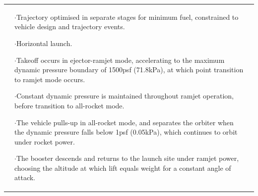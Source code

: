 {\begin{landscape}
\begin{xltabular}{\linewidth}{|X|X|X|}
	&\small
	
	$\cdot$Trajectory optimised in separate stages for minimum fuel, constrained to vehicle design and trajectory events. 
	
	$\cdot$Horizontal launch.
	
	$\cdot$Takeoff occurs in ejector-ramjet mode, accelerating to the maximum dynamic pressure boundary of 1500psf (71.8kPa), at which point transition to ramjet mode occurs. 
	
	$\cdot$Constant dynamic pressure is maintained throughout ramjet operation, before transition to all-rocket mode.
	
	$\cdot$The vehicle pulls-up in all-rocket mode, and separates the orbiter when the dynamic pressure falls below 1psf (0.05kPa), which continues to orbit under rocket power.
	
	$\cdot$The booster descends and returns to the launch site under ramjet power, choosing the altitude at which lift equals weight for a constant angle of attack. 
	

\end{xltabular}
\end{landscape}}
